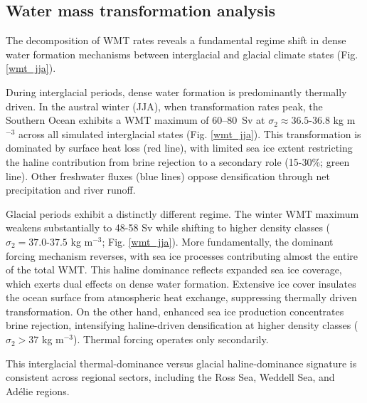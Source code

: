 \documentclass[draft]{agujournal2025}
\begin{document}
\subsection{Water mass transformation analysis}



The decomposition of WMT rates reveals a fundamental regime shift in dense water formation mechanisms between interglacial and glacial climate states (Fig. \ref{wmt_jja}).

During interglacial periods, dense water formation is predominantly thermally driven. In the austral winter (JJA), when transformation rates peak, the Southern Ocean exhibits a WMT maximum of 60--80~Sv at $\sigma_2 \approx 36.5$-$36.8$ kg m$^{-3}$ across all simulated interglacial states (Fig. \ref{wmt_jja}). This transformation is dominated by surface heat loss (red line), with limited sea ice extent restricting the haline contribution from brine rejection to a secondary role (15-30\%; green line). Other freshwater fluxes (blue lines) oppose densification through net precipitation and river runoff.

Glacial periods exhibit a distinctly different regime. The winter WMT maximum weakens substantially to 48-58 Sv while shifting to higher density classes ($\sigma_2 = 37.0$-$37.5$ kg m$^{-3}$; Fig. \ref{wmt_jja}). More fundamentally, the dominant forcing mechanism reverses, with sea ice processes contributing almost the entire of  the total WMT. This haline dominance reflects expanded sea ice coverage, which exerts dual effects on dense water formation.  Extensive ice cover insulates the ocean surface from atmospheric heat exchange, suppressing thermally driven transformation. On the other hand, enhanced sea ice production concentrates brine rejection, intensifying haline-driven densification at higher density classes ($\sigma_2 > 37$ kg m$^{-3}$). Thermal forcing operates only secondarily.

This interglacial thermal-dominance versus glacial haline-dominance signature is consistent across regional sectors, including the Ross Sea, Weddell Sea, and Ad\'{e}lie regions.

\end{document}
